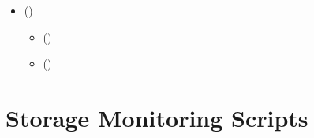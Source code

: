 \documentclass[letterpaper,10pt,english]{sphinxmanual}
\begin{document}
\begin{sphinxcontents}
\begin{itemize}
\begin{itemize}
\item {} 
\sphinxAtStartPar
{}\label{\detokenize{coding-examples:id16}}{\hyperref[\detokenize{coding-examples:script-configuration}]{}} ()

\end{itemize}

\item {} 
\sphinxAtStartPar
{}\label{\detokenize{coding-examples:id17}}{\hyperref[\detokenize{coding-examples:integration-examples}]{}} ()
\begin{itemize}
\item {} 
\sphinxAtStartPar
{}\label{\detokenize{coding-examples:id18}}{\hyperref[\detokenize{coding-examples:systemd-service-integration}]{}} ()

\item {} 
\sphinxAtStartPar
{}\label{\detokenize{coding-examples:id19}}{\hyperref[\detokenize{coding-examples:custom-alerts-integration}]{}} ()

\end{itemize}

\end{itemize}
\end{sphinxcontents}


\section{Storage Monitoring Scripts}
\label{\detokenize{coding-examples:storage-monitoring-scripts}}
\end{document}
